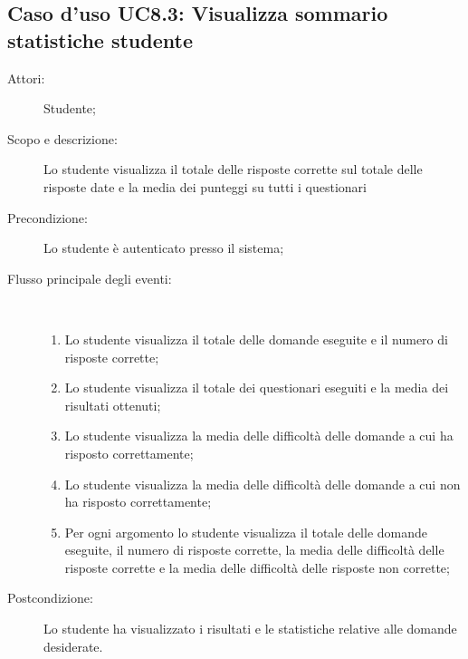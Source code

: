\subsection{Caso d'uso UC8.3: Visualizza sommario statistiche studente}\begin{description}
\item[Attori:] Studente;
\item[Scopo e descrizione:] Lo studente visualizza il totale delle risposte corrette sul totale delle risposte date e la media dei punteggi su tutti i questionari
      \item[Precondizione:] Lo studente è autenticato presso il sistema;

        \item[Flusso principale degli eventi:] \ 
 \begin{enumerate}
          \item Lo studente visualizza il totale delle domande eseguite e il numero di risposte corrette;
          \item Lo studente visualizza il totale dei questionari eseguiti e la media dei risultati ottenuti;
          \item Lo studente visualizza la media delle difficoltà delle domande a cui ha risposto correttamente;
          \item Lo studente visualizza la media delle difficoltà delle domande a cui non ha risposto correttamente;
          \item Per ogni argomento lo studente visualizza il totale delle domande eseguite, il numero di risposte corrette, la media delle difficoltà delle risposte corrette e la media delle difficoltà delle risposte non corrette;

      \end{enumerate}
    \item[Postcondizione:] Lo studente ha visualizzato i risultati e le statistiche relative alle domande desiderate.
  \end{description}
\hypertarget{UC9}{}
